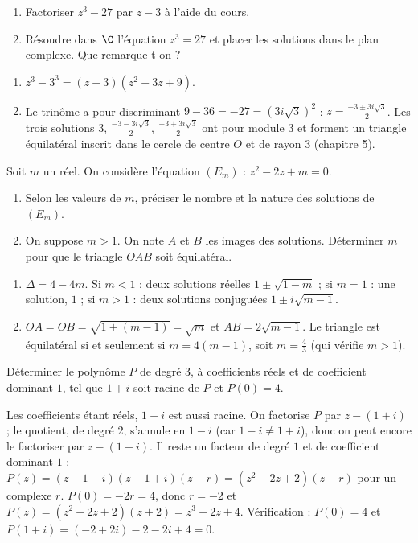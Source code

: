 \begin{exercise}[Factoriser $z^3-27$]
\begin{enumerate}
\item Factoriser $z^3-27$ par $z-3$ à l'aide du cours.
\item Résoudre dans $\C$ l'équation $z^3=27$ et placer les solutions dans le plan complexe. Que remarque-t-on ?
\end{enumerate}
\end{exercise}
\begin{solution}
\begin{enumerate}
\item $z^3-3^3=(z-3)\left(z^2+3z+9\right)$.
\item Le trinôme a pour discriminant $9-36=-27=\left(3i\sqrt3\right)^2$ : $z=\frac{-3\pm3i\sqrt3}2$. Les trois solutions $3$, $\frac{-3-3i\sqrt3}2$, $\frac{-3+3i\sqrt3}2$ ont pour module $3$ et forment un triangle équilatéral inscrit dans le cercle de centre $O$ et de rayon $3$ (chapitre 5).
\end{enumerate}
\end{solution}

\begin{exercise}[Un paramètre]
Soit $m$ un réel. On considère l'équation $(E_m)$ : $z^2-2z+m=0$.
\begin{enumerate}
\item Selon les valeurs de $m$, préciser le nombre et la nature des solutions de $(E_m)$.
\item On suppose $m>1$. On note $A$ et $B$ les images des solutions. Déterminer $m$ pour que le triangle $OAB$ soit équilatéral.
\end{enumerate}
\end{exercise}
\begin{solution}
\begin{enumerate}
\item $\Delta=4-4m$. Si $m<1$ : deux solutions réelles $1\pm\sqrt{1-m}$ ; si $m=1$ : une solution, $1$ ; si $m>1$ : deux solutions conjuguées $1\pm i\sqrt{m-1}$.
\item $OA=OB=\sqrt{1+(m-1)}=\sqrt m$ et $AB=2\sqrt{m-1}$. Le triangle est équilatéral si et seulement si $m=4(m-1)$, soit $m=\frac43$ (qui vérifie $m>1$).
\end{enumerate}
\end{solution}

\begin{exercise}
Déterminer le polynôme $P$ de degré $3$, à coefficients réels et de coefficient dominant $1$, tel que $1+i$ soit racine de $P$ et $P(0)=4$.
\end{exercise}
\begin{solution}
Les coefficients étant réels, $1-i$ est aussi racine. On factorise $P$ par $z-(1+i)$ ; le quotient, de degré $2$, s'annule en $1-i$ (car $1-i\neq1+i$), donc on peut encore le factoriser par $z-(1-i)$. Il reste un facteur de degré $1$ et de coefficient dominant $1$ : $P(z)=(z-1-i)(z-1+i)(z-r)=\left(z^2-2z+2\right)(z-r)$ pour un complexe $r$. $P(0)=-2r=4$, donc $r=-2$ et $P(z)=\left(z^2-2z+2\right)(z+2)=z^3-2z+4$. Vérification : $P(0)=4$ et $P(1+i)=(-2+2i)-2-2i+4=0$.
\end{solution}


